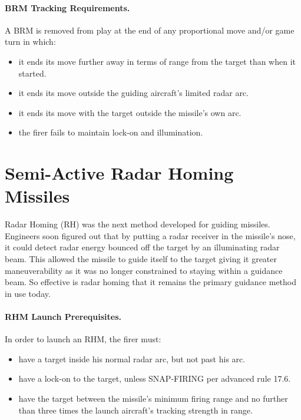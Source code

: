 \paragraph{BRM Tracking Requirements.} A BRM is removed from play at the end of any proportional move and/or game turn in which:

\begin{itemize}

    \item it ends its move further away in terms of range from the target than when it started.

    \item it ends its move outside the guiding aircraft's limited radar arc.

    \item it ends its move with the target outside the missile's own  arc.

    \item the firer fails to maintain lock-on and illumination.

\end{itemize}

\section{Semi-Active Radar Homing Missiles}
\label{rule:semi-active-radar-homing-missiles}

Radar Homing (RH) was the next method developed for guiding missiles. Engineers soon figured out that by putting a radar receiver in the missile's nose, it could detect radar energy bounced off the target by an illuminating radar beam. This allowed the missile to guide itself to the target giving it greater maneuverability as it was no longer constrained to staying within a guidance beam. So effective is radar homing that it remains the primary guidance method in use today.

\paragraph{RHM Launch Prerequisites.} In order to launch an RHM, the firer must:

\begin{itemize}

    \item have a target inside his normal radar arc, but not past his  arc.

    \item have a lock-on to the target, unless SNAP-FIRING per advanced rule 17.6.

    \item have the target between the missile's minimum firing range and no further than three times the launch aircraft's tracking strength in range.

\end{itemize}

